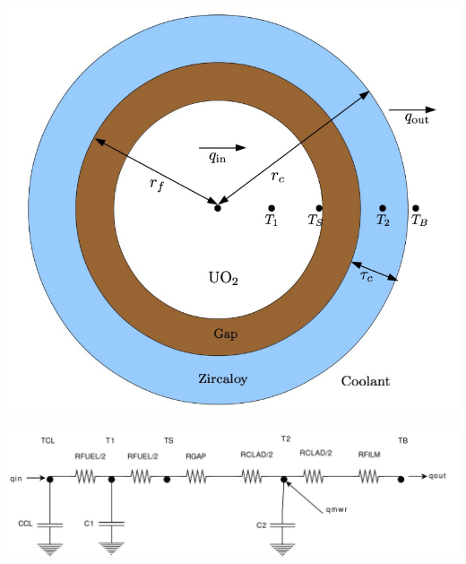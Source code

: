\documentclass[usenames,dvipsnames]{beamer}
\begin{document}
\begin{frame}

  
  \begin{center}
   \includegraphics[width=0.6\columnwidth]{fuelpin.png}
  \end{center}
  
  \begin{center}
  {
   \includegraphics[width=1.0\columnwidth]{electricalcircuitanalogue.pdf}
  }
  \end{center}
  
\end{frame}
  
\end{document}
